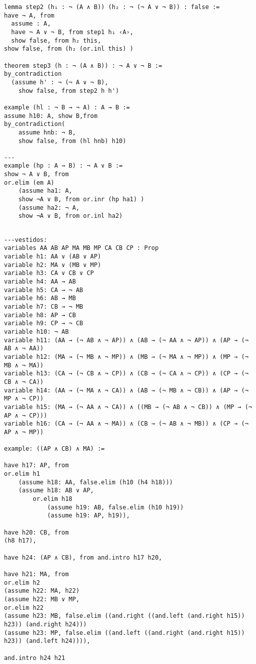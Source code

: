 \begin{lstlisting}
lemma step2 (h₁ : ¬ (A ∧ B)) (h₂ : ¬ (¬ A ∨ ¬ B)) : false :=
have ¬ A, from
  assume : A,
  have ¬ A ∨ ¬ B, from step1 h₁ ‹A›,
  show false, from h₂ this,
show false, from (h₂ (or.inl this) )

theorem step3 (h : ¬ (A ∧ B)) : ¬ A ∨ ¬ B :=
by_contradiction
  (assume h' : ¬ (¬ A ∨ ¬ B),
    show false, from step2 h h')

example (hl : ¬ B → ¬ A) : A → B :=
assume h10: A, show B,from
by_contradiction(
    assume hnb: ¬ B,
    show false, from (hl hnb) h10)

---
example (hp : A → B) : ¬ A ∨ B :=
show ¬ A ∨ B, from
or.elim (em A)
    (assume ha1: A,
    show ¬A ∨ B, from or.inr (hp ha1) )
    (assume ha2: ¬ A,
    show ¬A ∨ B, from or.inl ha2)
\end{lstlisting}

\begin{lstlisting}

---vestidos:
variables AA AB AP MA MB MP CA CB CP : Prop 
variable h1: AA ∨ (AB ∨ AP)
variable h2: MA ∨ (MB ∨ MP)
variable h3: CA ∨ CB ∨ CP
variable h4: AA → AB
variable h5: CA → ¬ AB
variable h6: AB → MB
variable h7: CB → ¬ MB
variable h8: AP → CB
variable h9: CP → ¬ CB
variable h10: ¬ AB
variable h11: (AA → (¬ AB ∧ ¬ AP)) ∧ (AB → (¬ AA ∧ ¬ AP)) ∧ (AP → (¬ AB ∧ ¬ AA))
variable h12: (MA → (¬ MB ∧ ¬ MP)) ∧ (MB → (¬ MA ∧ ¬ MP)) ∧ (MP → (¬ MB ∧ ¬ MA))
variable h13: (CA → (¬ CB ∧ ¬ CP)) ∧ (CB → (¬ CA ∧ ¬ CP)) ∧ (CP → (¬ CB ∧ ¬ CA))
variable h14: (AA → (¬ MA ∧ ¬ CA)) ∧ (AB → (¬ MB ∧ ¬ CB)) ∧ (AP → (¬ MP ∧ ¬ CP))
variable h15: (MA → (¬ AA ∧ ¬ CA)) ∧ ((MB → (¬ AB ∧ ¬ CB)) ∧ (MP → (¬ AP ∧ ¬ CP)))
variable h16: (CA → (¬ AA ∧ ¬ MA)) ∧ (CB → (¬ AB ∧ ¬ MB)) ∧ (CP → (¬ AP ∧ ¬ MP))

example: ((AP ∧ CB) ∧ MA) :=

have h17: AP, from 
or.elim h1
    (assume h18: AA, false.elim (h10 (h4 h18)))
    (assume h18: AB ∨ AP,
        or.elim h18
            (assume h19: AB, false.elim (h10 h19))
            (assume h19: AP, h19)),

have h20: CB, from 
(h8 h17),

have h24: (AP ∧ CB), from and.intro h17 h20,

have h21: MA, from 
or.elim h2
(assume h22: MA, h22)
(assume h22: MB ∨ MP,
or.elim h22
(assume h23: MB, false.elim ((and.right ((and.left (and.right h15)) h23)) (and.right h24)))
(assume h23: MP, false.elim ((and.left ((and.right (and.right h15)) h23)) (and.left h24)))),

and.intro h24 h21
\end{lstlisting}

